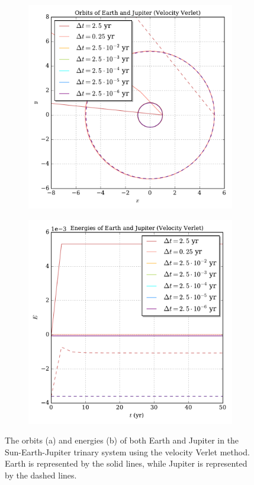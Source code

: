 \documentclass[prb,aps,twocolumn,showpacs,10pt]{revtex4-1}
\begin{document}
\begin{figure}
\centering
\begin{subfigure}{.5\textwidth}
  \centering
  \includegraphics[width=\linewidth]{trinary_fixed_vv_orbit.pdf}
  \label{fig:sub1}
\end{subfigure}%
\begin{subfigure}{.5\textwidth}
  \centering
  \includegraphics[width=\linewidth]{trinary_fixed_vv_energy.pdf}
  \label{fig:sub2}
\end{subfigure}
\caption{The orbits (a) and energies (b) of both Earth and Jupiter in the Sun-Earth-Jupiter trinary system using the velocity Verlet method. Earth is represented by the solid lines, while Jupiter is represented by the dashed lines.}
\label{fig:test}
\end{figure}
\end{document}
